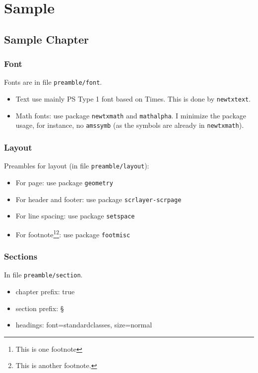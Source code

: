 \documentclass[%
	12pt, %
]{scrbook} %
\begin{document}
\frontmatter
\maketitle
\tableofcontents
\begin{abstract}
	
\end{abstract}
\begin{dedication}
	
\end{dedication}
\begin{acknowledgement}
	
\end{acknowledgement}
\mainmatter
\part{Sample}
\chapter{Sample Chapter}
\section{Font}
Fonts are in file \texttt{preamble/font}. 
\begin{itemize}
	\item Text use mainly PS Type 1 font based on Times. This is done by \texttt{newtxtext}.
	\item Math fonts: use package \texttt{newtxmath} and \texttt{mathalpha}. I minimize the package usage, for instance, no \texttt{amssymb} (as the symbols are already in \texttt{newtxmath}).
\end{itemize}
\section{Layout}
Preambles for layout (in file \texttt{preamble/layout}):
\begin{itemize}
	\item For page: use package \texttt{geometry}
	\item For header and footer: use package \texttt{scrlayer-scrpage}
	\item For line spacing: use package \texttt{setspace}
	\item For footnote\footnote{This is one footnote}\footnote{This is another footnote.}: use package \texttt{footmisc}
\end{itemize}
\section{Sections}
In file \texttt{preamble/section}.
\begin{itemize}
	\item chapter prefix: true 
	\item section prefix: \S
	\item headings: font=standardclasses, size=normal
\end{itemize}
\end{document}
